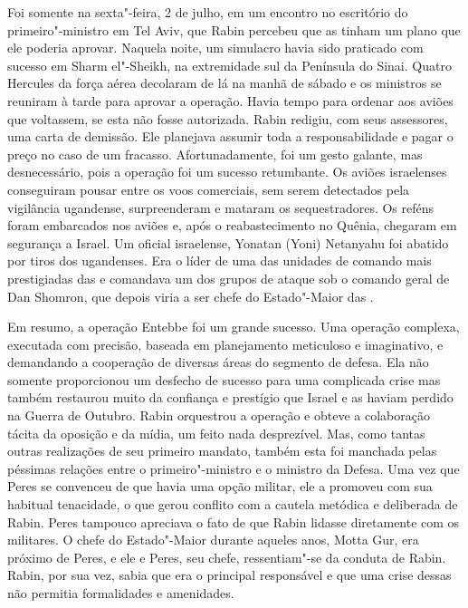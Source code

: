 Foi somente na sexta"-feira, 2 de julho, em um encontro no escritório do
primeiro"-ministro em Tel Aviv, que Rabin percebeu que as  tinham um
plano que ele poderia aprovar. Naquela noite, um simulacro
havia sido praticado com sucesso em Sharm el"-Sheikh, na extremidade sul
da Península do Sinai. Quatro Hercules da força aérea decolaram de lá na
manhã de sábado e os ministros se reuniram à tarde para aprovar a
operação. Havia tempo para ordenar aos aviões que voltassem, se esta não
fosse autorizada. Rabin redigiu, com seus assessores, uma carta de
demissão. Ele planejava assumir toda a responsabilidade e pagar o preço
no caso de um fracasso. Afortunadamente, foi um gesto galante, mas
desnecessário, pois a operação foi um sucesso retumbante. Os aviões
israelenses conseguiram pousar entre os voos comerciais, sem serem
detectados pela vigilância ugandense, surpreenderam e mataram os
sequestradores. Os reféns foram embarcados nos aviões e, após o
reabastecimento no Quênia, chegaram em segurança a Israel. Um oficial
israelense, Yonatan (Yoni) Netanyahu foi abatido por tiros dos
ugandenses. Era o líder de uma das unidades de comando mais prestigiadas
das  e comandava um dos grupos de ataque sob o comando geral de Dan
Shomron, que depois viria a ser chefe do Estado"-Maior das .

Em resumo, a operação Entebbe foi um grande sucesso. Uma operação
complexa, executada com precisão, baseada em planejamento meticuloso e
imaginativo, e demandando a cooperação de diversas áreas do segmento de
defesa. Ela não somente proporcionou um desfecho de sucesso para uma
complicada crise mas também restaurou muito da confiança e prestígio
que Israel e as  haviam perdido na Guerra de Outubro. Rabin
orquestrou a operação e obteve a colaboração tácita da oposição e da
mídia, um feito nada desprezível. Mas, como tantas outras realizações de
seu primeiro mandato, também esta foi manchada pelas péssimas relações
entre o primeiro"-ministro e o ministro da Defesa. Uma vez que Peres se
convenceu de que havia uma opção militar, ele a promoveu com sua
habitual tenacidade, o que gerou conflito com a cautela metódica e
deliberada de Rabin. Peres tampouco apreciava o fato de que Rabin
lidasse diretamente com os militares. O chefe do Estado"-Maior durante
aqueles anos, Motta Gur, era próximo de Peres, e ele e Peres, seu chefe,
ressentiam"-se da conduta de Rabin. Rabin, por sua vez, sabia que era o
principal responsável e que uma crise dessas não permitia formalidades e
amenidades.

